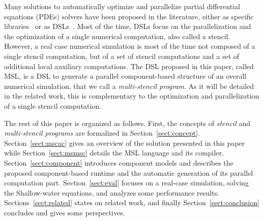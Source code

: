 Many solutions to automatically optimize and parallelize partial differential equations (PDEs) solvers have been proposed in the literature, either as specific libraries~\cite{petsc-efficient,Trilinos-Overview,CPE:CPE3494} or as DSLs~\cite{spaaTangCKLL11,citeulike12258902,Giles2011,DeVito2011LDS}. Most of the time, DSLs focus on the parallelization and the optimization of a single numerical computation, also called a stencil.
However, a real case numerical simulation is most of the time not composed of a single stencil computation, but of a set of stencil computations and a set of additional local auxiliary computations. The DSL proposed in this paper, called MSL, is a DSL to generate a parallel component-based structure of an overall numerical simulation, that we call a \emph{multi-stencil program}. As it will be detailed in the related work, this is complementary to the optimization and parallelization of a single stencil computation.

The rest of this paper is organized as follows. First, the concepts of \emph{stencil} and \emph{multi-stencil programs} are formalized in Section~\ref{sect:concept}. Section~\ref{sect:mscac} gives an overview of the solution presented in this paper while Section~\ref{sect:msmsc} details the MSL language and its compiler. Section~\ref{sect:component} introduces component models and describes the proposed component-based runtime and the automatic generation of its parallel computation part.
Section~\ref{sect:eval} focuses on a real-case simulation, solving the Shallow-water equations, and analyzes some performance results. Sections~\ref{sect:related} states on related work, and finally Section~\ref{sect:conclusion} concludes and gives some perspectives.
